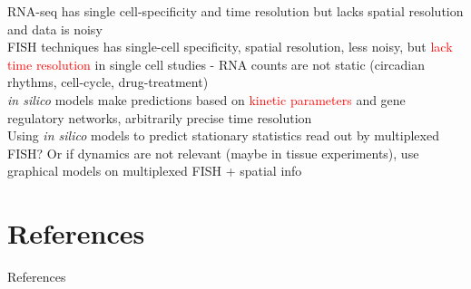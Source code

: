 \documentclass[aspectratio=1610]{beamer}					%
\begin{document}
\begin{frame}{}
RNA-seq has single cell-specificity and time resolution but lacks spatial resolution and data is noisy\\
\vspace{0.2in}
FISH techniques has single-cell specificity, spatial resolution, less noisy, but \textcolor{red}{lack time resolution} in single cell studies - RNA counts are not static (circadian rhythms, cell-cycle, drug-treatment)\\
\vspace{0.2in}
\emph{in silico} models make predictions based on \textcolor{red}{kinetic parameters} and gene regulatory networks, arbitrarily precise time resolution\\
\vspace{0.2in}
Using \emph{in silico} models to predict stationary statistics read out by multiplexed FISH? Or if dynamics are not relevant (maybe in tissue experiments), use graphical models on multiplexed FISH + spatial info
\end{frame}

\section{References}

\begin{frame}[allowframebreaks]{References}
	\tiny
	
\end{frame}
\end{document}
